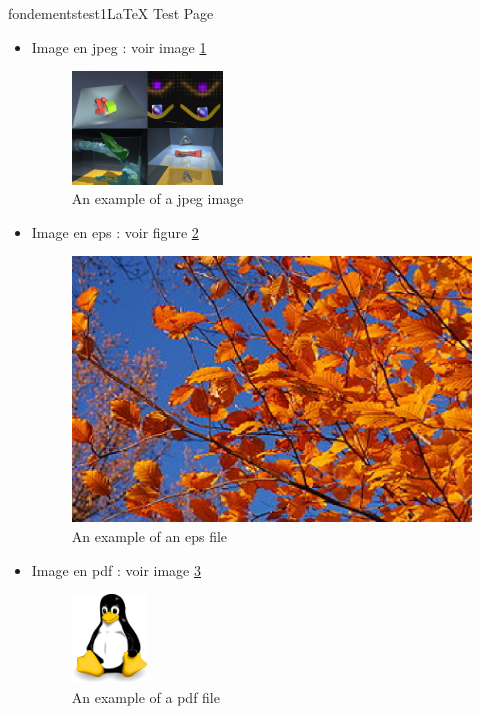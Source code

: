 \documentclass{ra2018}
\begin{document}
\begin{module}{fondements}{test1}{LaTeX Test Page}
\begin{itemize}
\item Image en jpeg : voir image \ref{fig:jpegimage} \\

\begin{figure}
\begin{center}
\includegraphics[width=4cm]{IMG/imagejpeg}
\end{center}
\caption{An example of a jpeg image}
\label{fig:jpegimage}
\end{figure}

\item  Image en eps : voir figure \ref{fig:completemap} \\  

\begin{figure}
\begin{center}
\includegraphics{IMG/imageeps}
\end{center}
\caption{An example of an eps file}
\label{fig:completemap}
\end{figure}

\item Image en pdf : voir image \ref{fig:pdffile} \\  

\begin{figure}
\includegraphics[width=2cm]{IMG/imagepdf}
\caption{An example of a pdf file}
\label{fig:pdffile}
\end{figure}

\end{itemize}

\end{module}
\end{document}

